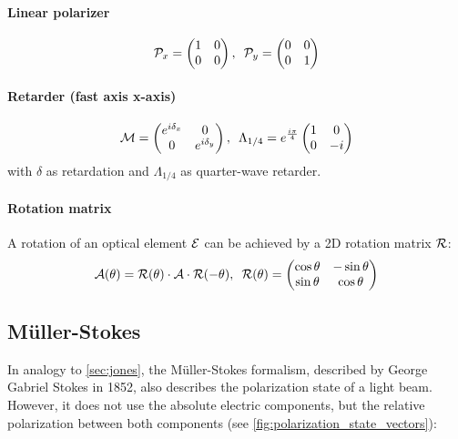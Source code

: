\paragraph{Linear polarizer}
\begin{align}
\mathcal{P}_x =
\begin{pmatrix}
1 & 0 \\ 0 & 0
\end{pmatrix}
, \enspace
\mathcal{P}_y =
\begin{pmatrix}
0 & 0 \\ 0 & 1
\end{pmatrix}
\end{align}
% 
\paragraph{Retarder (fast axis x-axis)}
\begin{align}
\mat{M} =
\begin{pmatrix}
e^{i \delta_x} & 0 \\ 0 & e^{i \delta_y}
\end{pmatrix}
, \enspace
% 
\Lambda_{1/4}=
e^{\frac{i \pi}{4}}
\begin{pmatrix}
1 & 0 \\ 0 & -i
\end{pmatrix}
\end{align}
% 
with $\delta$ as retardation and $\Lambda_{1/4}$ as quarter-wave retarder.
%
\paragraph{Rotation matrix}
A rotation of an optical element $\mathcal{E}$ can be achieved by a 2D rotation matrix $\mathcal{R}$:
\begin{align}
\begin{split}\label{eq::JonesRotation}
\mathcal{A}(\theta )=\mathcal{R}(\theta )\cdot\mathcal{A}\cdot\mathcal{R}(-\theta )
, \enspace
\mathcal{R}(\theta ) =
\begin{pmatrix}
\cos \theta & -\sin \theta \\
\sin \theta & \cos \theta
\end{pmatrix}
\end{split}
\end{align}
% 
%
%
\subsection{M{\"u}ller-Stokes}\label{sec:MuellerStokes}
%
In analogy to \cref{sec:jones}, the M{\"u}ller-Stokes formalism, described by George Gabriel Stokes in 1852, also describes the polarization state of a light beam.
However, it does not use the absolute electric components, but the relative polarization between both components (see \cref{fig:polarization_state_vectors}):
%
